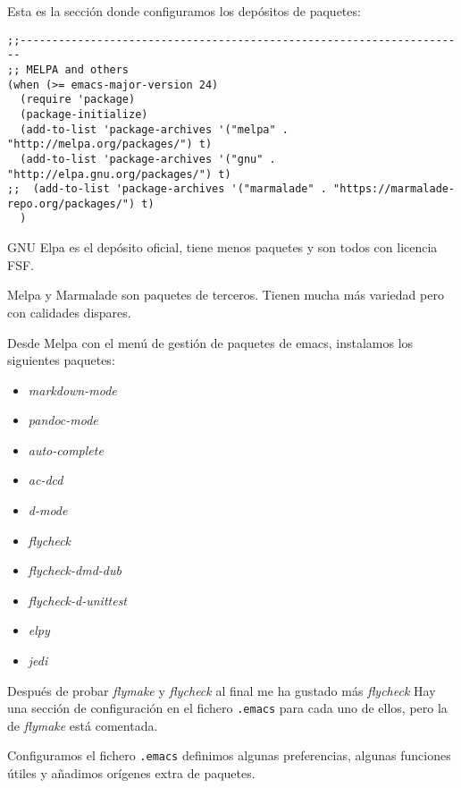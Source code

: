 \documentclass[
  12pt,
  spanish,
]{article}
\providecommand{\tightlist}{%
  \setlength{\itemsep}{0pt}\setlength{\parskip}{0pt}}
\begin{document}
Esta es la sección donde configuramos los depósitos de paquetes:

\begin{verbatim}
;;----------------------------------------------------------------------
;; MELPA and others
(when (>= emacs-major-version 24)
  (require 'package)
  (package-initialize)
  (add-to-list 'package-archives '("melpa" . "http://melpa.org/packages/") t)
  (add-to-list 'package-archives '("gnu" . "http://elpa.gnu.org/packages/") t)
;;  (add-to-list 'package-archives '("marmalade" . "https://marmalade-repo.org/packages/") t)
  )
\end{verbatim}

GNU Elpa es el depósito oficial, tiene menos paquetes y son todos con
licencia FSF.

Melpa y Marmalade son paquetes de terceros. Tienen mucha más variedad
pero con calidades dispares.

Desde Melpa con el menú de gestión de paquetes de emacs, instalamos los
siguientes paquetes:

\begin{itemize}
\tightlist
\item
  \emph{markdown-mode}
\item
  \emph{pandoc-mode}
\item
  \emph{auto-complete}
\item
  \emph{ac-dcd}
\item
  \emph{d-mode}
\item
  \emph{flycheck}
\item
  \emph{flycheck-dmd-dub}
\item
  \emph{flycheck-d-unittest}
\item
  \emph{elpy}
\item
  \emph{jedi}
\end{itemize}

Después de probar \emph{flymake} y \emph{flycheck} al final me ha
gustado más \emph{flycheck} Hay una sección de configuración en el
fichero \texttt{.emacs} para cada uno de ellos, pero la de
\emph{flymake} está comentada.

Configuramos el fichero \texttt{.emacs} definimos algunas preferencias,
algunas funciones útiles y añadimos orígenes extra de paquetes.
\end{document}
